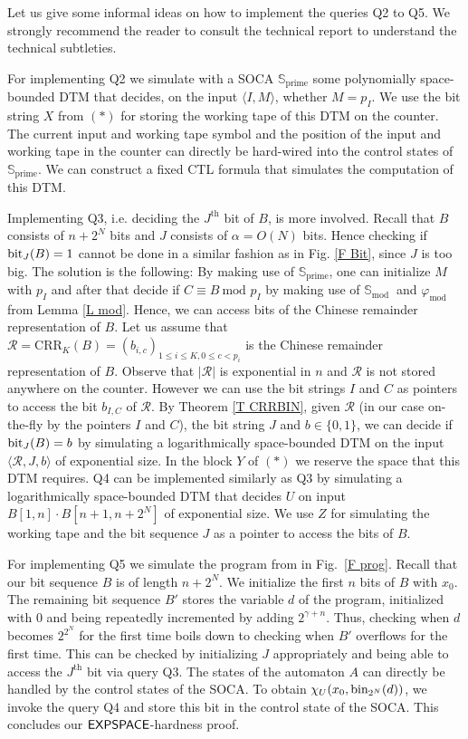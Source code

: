 \documentclass[times,envcountsame]{llncs}
\newcommand{\prim}{\text{prime}}
\renewcommand{\mod}{\text{mod }}
\def\CRR{{\mathrm{CRR}}}
\newcommand{\Soca}{\mathbb{S}}
\begin{document}
\newcommand{\BIT}{\text{BIT}}
\renewcommand{\R}{\mathcal{R}}

\noindent
Let us give some informal ideas on how to implement the queries
Q2 to Q5. We strongly recommend
the reader to consult the technical report \cite{techrep}
to understand the technical subtleties.

For implementing Q2 we simulate with a SOCA $\Soca_\prim$ some
polynomially space-bounded DTM
that decides, on the input $\langle I,M\rangle$, whether
$M=p_I$. We use the bit string $X$ from $(*)$ for storing the working tape
of this DTM on the counter.
The current input and working tape symbol and the position of the
input and working tape in the counter can directly be hard-wired
into the control states of $\Soca_\prim$.
We can construct a fixed CTL formula that
simulates the computation of this DTM.

Implementing Q3, i.e. deciding the $J^{\text{th}}$ bit of
$B$, is more involved.
Recall that $B$ consists of $n+2^N$ bits and $J$ consists of
$\alpha=O(N)$ bits.
Hence checking if $\text{bit}_J(B)=1$ cannot be done in a similar fashion as in
Fig. \ref{F Bit}, since $J$ is too big.
The solution is the following: By making use of $\Soca_\prim$, one can initialize
 $M$ with $p_I$ and after that
decide if $C\equiv B\ \mod p_I$
by making use of $\Soca_{\mod}$ and $\varphi_\mod$
from Lemma \ref{L mod}.
Hence, we can access bits of the Chinese remainder representation of $B$.
Let us assume that $\R=\CRR_{K}(B)=(b_{i,c})_{1\leq i\leq K,0\leq c<p_i}$
is the Chinese remainder representation of $B$.
Observe that $|\R|$ is exponential in $n$ and
$\R$ is not stored anywhere on the counter.
However we
can use the bit strings $I$ and $C$ as pointers to access
the bit $b_{I,C}$ of $\R$.
By Theorem \ref{T CRRBIN}, given $\R$ (in our case on-the-fly by the pointers
$I$ and $C$), the bit string $J$ and $b\in\{0,1\}$,
we can decide if $\text{bit}_J(B)=b$
by simulating a logarithmically space-bounded DTM
on the input $\langle\R,J,b\rangle$ of exponential size.
In the block $Y$ of $(*)$ we reserve the space that this DTM requires.
Q4 can be implemented similarly as Q3 by simulating
a logarithmically space-bounded DTM that decides $U$ on input
$B[1,n]\cdot B[n+1,n+2^N]$ of exponential size.
We use $Z$ for simulating the working tape and the bit sequence $J$ as a
pointer to access the bits of $B$.

For implementing Q5 we
simulate the program from in Fig.\ \ref{F prog}.
Recall that our bit sequence $B$ is of length $n+2^N$.
We initialize the first $n$ bits of $B$ with $x_0$.
The remaining bit sequence $B'$ stores the variable $d$ of the program, initialized with $0$
and being repeatedly incremented by adding $2^{\gamma+n}$.
Thus, checking when $d$ becomes $2^{2^N}$ for the first time boils down to checking
when $B'$ overflows for the first time.
This can be checked by initializing $J$ appropriately and
being able to access the $J^{\text{th}}$ bit via query Q3.
The states of the automaton $A$ can directly be handled by the control states of the
SOCA. To obtain $\chi_U(x_0,\text{bin}_{2^N}(d))$, we invoke the query Q4 and store
this bit in the control state of the SOCA. This concludes our ${\mathsf{EXPSPACE}}$-hardness proof.
\end{document}
